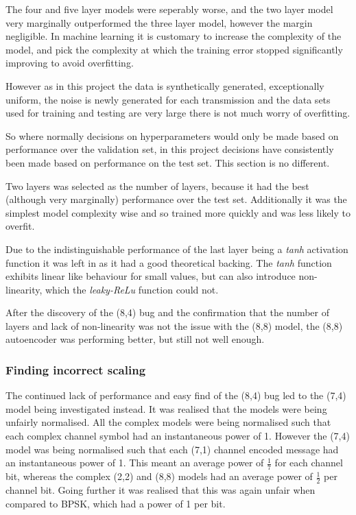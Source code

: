 \documentclass[12pt,onecolumn,letterpaper]{article}
\newcommand{\code}{\textit}
\begin{document}
The four and five layer models were seperably worse, and the two layer model very marginally outperformed the three layer model, however the margin negligible. In machine learning it is customary to increase the complexity of the model, and pick the complexity at which the training error stopped significantly improving to avoid overfitting.

However as in this project the data is synthetically generated, exceptionally uniform, the noise is newly generated for each transmission and the data sets used for training and testing are very large there is not much worry of overfitting.

So where normally decisions on hyperparameters would only be made based on performance over the validation set, in this project decisions have consistently been made based on performance on the test set. This section is no different. 

Two layers was selected as the number of layers, because it had the best (although very marginally) performance over the test set. Additionally it was the simplest model complexity wise and so trained more quickly and was less likely to overfit.

Due to the indistinguishable performance of the last layer being a \code{tanh} activation function it was left in as it had a good theoretical backing. The \code{tanh} function exhibits linear like behaviour for small values, but can also introduce non-linearity, which the \code{leaky-ReLu} function could not.

After the discovery of the (8,4) bug and the confirmation that the number of layers and lack of non-linearity was not the issue with the (8,8) model, the (8,8) autoencoder was performing better, but still not well enough. 

\subsubsection{Finding incorrect scaling}
\label{sec:CorrectingScaling}

The continued lack of performance and easy find of the (8,4) bug led to the (7,4) model being investigated instead. It was realised that the models were being unfairly normalised. All the complex models were being normalised such that each complex channel symbol had an instantaneous power of 1. However the (7,4) model was being normalised such that each (7,1) channel encoded message had an instantaneous power of 1. This meant an average power of $\frac{1}{7}$ for each channel bit, whereas the complex (2,2) and (8,8) models had an average power of $\frac{1}{2}$ per channel bit. Going further it was realised that this was again unfair when compared to BPSK, which had a power of 1 per bit. 
\end{document}

